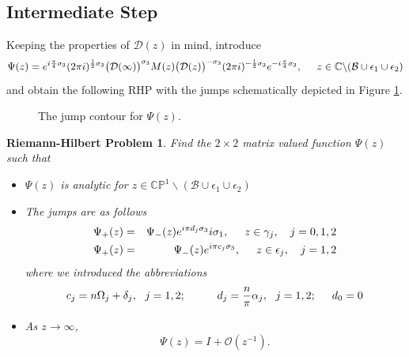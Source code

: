 \documentclass[10pt,oneside,reqno]{amsart}
\numberwithin{equation}{section}
\newtheorem{problem}[theorem]{Riemann-Hilbert Problem}
\begin{document}
%
%
\subsection{Intermediate Step}
Keeping the properties of $\mathcal{D}(z)$ in mind, introduce
\begin{equation*}
  \Psi(z) = e^{i\frac{\pi}{4}\sigma_3}(2\pi i)^{\frac{1}{2}\sigma_3}\big(\mathcal{D}(\infty)\big)^{\sigma_3}M(z)
  \big(\mathcal{D}(z)\big)^{-\sigma_3}(2\pi i)^{-\frac{1}{2}\sigma_3}e^{-i\frac{\pi}{4}\sigma_3},\hspace{0.5cm}z\in\mathbb{C}\backslash(\mathcal{B}\cup \epsilon_1\cup \epsilon_2)
\end{equation*}
and obtain the following RHP with the jumps schematically depicted in Figure \ref{szego}.
\begin{figure}[tbh]
\begin{center}
\resizebox{0.3\textwidth}{!}{}
\caption{The jump contour for $\Psi(z)$.}
\label{szego}
\end{center}
\end{figure}
\begin{problem}
\label{RHPPsi}
Find the $2\times 2$ matrix valued function $\Psi(z)$ such that 
\begin{itemize}
 \item 	$\Psi(z)$ is analytic for $z\in\mathbb{CP}^1\backslash(\mathcal{B}\cup \epsilon_1\cup \epsilon_2)$
  \item The jumps are as follows
\begin{eqnarray*}
  \Psi_+(z) &=& \Psi_-(z)e^{i\pi d_j\sigma_3}i\sigma_1,\hspace{0.5cm}z\in\gamma_j,\ \ \ j=0,1,2\\
  \Psi_+(z) &=& \Psi_-(z)e^{i\pi c_j\sigma_3},\hspace{0.5cm}z\in \epsilon_j,\ \ \ j=1,2
\end{eqnarray*}
where we introduced the abbreviations
\begin{equation}\label{abbrevi}
 c_j=n\Omega_j+\delta_j,\ \ j=1,2;\hspace{1cm}d_j = \frac{n}{\pi}\alpha_j,\ \ j=1,2;\hspace{0.5cm}d_0=0
\end{equation}
  \item As $z\rightarrow\infty$,
\begin{equation*}
  \Psi(z)= I+\mathcal O\left(z^{-1}\right).
\end{equation*}
\end{itemize}
\end{problem}
\end{document}
